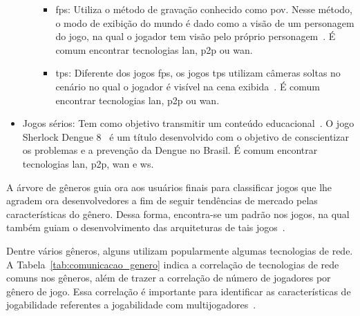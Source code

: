 \begin{itemize}
\begin{itemize}
        \begin{itemize}
          \item \ac{fps}: Utiliza o método de gravação conhecido como \ac{pov}. Nesse método, o modo de exibição do mundo é dado como a visão de um personagem do jogo, na qual o jogador tem visão pelo próprio personagem~\cite{video_game_technologies, adams_1208533}. É comum encontrar tecnologias \ac{lan}, \ac{p2p} ou \ac{wan}.
          \item \ac{tps}: Diferente dos jogos \ac{fps}, os jogos \ac{tps} utilizam câmeras soltas no cenário no qual o jogador é visível na cena exibida~\cite{video_game_technologies, adams_1208533}. É comum encontrar tecnologias \ac{lan}, \ac{p2p} ou \ac{wan}.
        \end{itemize}
    \end{itemize}
  \item Jogos sérios: Tem como objetivo transmitir um conteúdo educacional~\cite{video_game_technologies}. O jogo Sherlock Dengue 8~\cite{sherlock_dengue} é um título desenvolvido com o objetivo de conscientizar os problemas e a prevenção da Dengue no Brasil. É comum encontrar tecnologias \ac{lan}, \ac{p2p}, \ac{wan} e \ac{ws}.
\end{itemize}

A árvore de gêneros guia ora aos usuários finais para classificar jogos que lhe agradem ora desenvolvedores a fim de seguir tendências de mercado pelas características do gênero.
%
Dessa forma, encontra-se um padrão nos jogos, na qual também guiam o desenvolvimento das arquiteturas de tais jogos~\cite{video_game_technologies}.

Dentre vários gêneros, alguns utilizam popularmente algumas tecnologias de rede.
%
A Tabela~\ref{tab:comunicacao_genero} indica a correlação de tecnologias de rede comuns nos gêneros, além de trazer a correlação de número de jogadores por gênero de jogo.
%
Essa correlação é importante para identificar as características de jogabilidade referentes a jogabilidade com multijogadores~\cite{video_game_technologies}.


